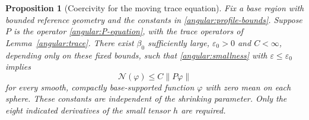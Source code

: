 \documentclass[11pt]{article}
\newtheorem{proposition}[theorem]{Proposition}
\theoremstyle{definition}
\theoremstyle{remark}
\newcommand{\eps}{\varepsilon}
\numberwithin{equation}{section}
\begin{document}
\begin{proposition}[Coercivity for the moving trace equation]
\label{angular:coercivity}
Fix a base region with bounded reference geometry and the constants in
\eqref{angular:profile-bounds}.  Suppose $P$ is the operator
\eqref{angular:P-equation}, with the trace operators of
Lemma~\ref{angular:trace}.  There exist $\beta_0$ sufficiently large,
$\eps_0>0$ and $C<\infty$, depending only on these fixed bounds, such that
\eqref{angular:smallness} with $\eps\le\eps_0$ implies
\begin{equation}\label{angular:coercive-estimate}
 \mathcal N(\varphi)\le C\|P\varphi\|
\end{equation}
for every smooth, compactly base-supported function $\varphi$ with
zero mean on each sphere.  These constants are independent of the
shrinking parameter.  Only the eight indicated derivatives of the small
tensor $h$ are required.
\end{proposition}
\end{document}
